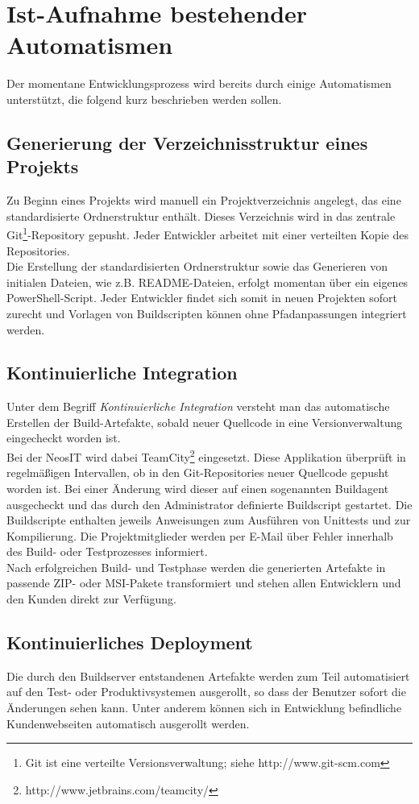 \documentclass[a4paper,12pt]{scrreprt}
\begin{document}
\section{Ist-Aufnahme bestehender Automatismen}
\label{sec:verbesserung}
Der momentane Entwicklungsprozess wird bereits durch einige Automatismen unterstützt, die folgend kurz beschrieben werden sollen.
\subsection{Generierung der Verzeichnisstruktur eines Projekts}
Zu Beginn eines Projekts wird manuell ein Projektverzeichnis angelegt, das eine standardisierte Ordnerstruktur enthält. Dieses Verzeichnis wird in das zentrale Git\footnote{Git ist eine verteilte Versionsverwaltung; siehe http://www.git-scm.com}-Repository gepusht. Jeder Entwickler arbeitet mit einer verteilten Kopie des Repositories.
\\
Die Erstellung der standardisierten Ordnerstruktur sowie das Generieren von initialen Dateien, wie z.B. README-Dateien, erfolgt momentan über ein eigenes PowerShell-Script.
Jeder Entwickler findet sich somit in neuen Projekten sofort zurecht und Vorlagen von Buildscripten können ohne Pfadanpassungen integriert werden.
\subsection{Kontinuierliche Integration}
Unter dem Begriff \emph{Kontinuierliche Integration} versteht man das automatische Erstellen der Build-Artefakte, sobald neuer Quellcode in eine Versionverwaltung eingecheckt worden ist.\\
Bei der NeosIT wird dabei TeamCity\footnote{http://www.jetbrains.com/teamcity/} eingesetzt. Diese Applikation überprüft in regelmäßigen Intervallen, ob in den Git-Repositories neuer Quellcode gepusht worden ist. Bei einer Änderung wird dieser auf einen sogenannten Buildagent ausgecheckt und das durch den Administrator definierte Buildscript gestartet. Die Buildscripte enthalten jeweils Anweisungen zum Ausführen von Unittests und zur Kompilierung. Die Projektmitglieder werden per E-Mail über Fehler innerhalb des Build- oder Testprozesses informiert.\\
Nach erfolgreichen Build- und Testphase werden die generierten Artefakte in passende ZIP- oder MSI-Pakete transformiert und stehen allen Entwicklern und den Kunden direkt zur Verfügung.
\subsection{Kontinuierliches Deployment}
Die durch den Buildserver entstandenen Artefakte werden zum Teil automatisiert auf den Test- oder Produktivsystemen ausgerollt, so dass der Benutzer sofort die Änderungen sehen kann. Unter anderem können sich in Entwicklung befindliche Kundenwebseiten automatisch ausgerollt werden.
\end{document}
